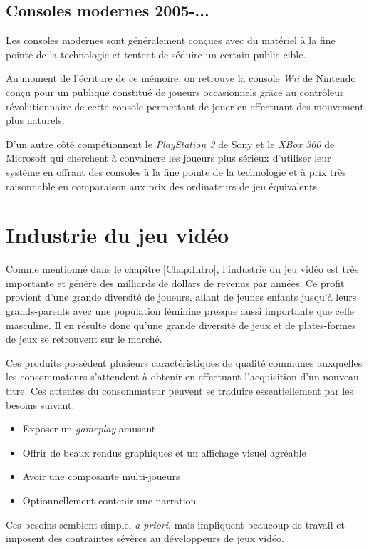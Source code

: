 \documentclass[12pt,oneside,letterpaper,francais]{book}
\begin{document}
\subsection{Consoles modernes 2005-...}
Les consoles modernes sont généralement conçues avec du matériel à la
fine pointe de la technologie et tentent de séduire un certain public
cible.

Au moment de l'écriture de ce mémoire, on retrouve la console
\textit{Wii} de Nintendo conçu pour un publique constitué de joueurs
occasionnels grâce au contrôleur révolutionnaire de cette console
permettant de jouer en effectuant des mouvement plus naturels.

D'un autre côté compétionnent le \textit{PlayStation 3} de Sony et le
\textit{XBox 360} de Microsoft qui cherchent à convaincre les joueurs
plus sérieux d'utiliser leur système en offrant des consoles à la fine
pointe de la technologie et à prix très raisonnable en comparaison aux
prix des ordinateurs de jeu équivalents. 



\section{Industrie du jeu vidéo}
Comme mentionné dans le chapitre \ref{Chap:Intro}, l'industrie du jeu
vidéo est très importante et génère des milliards de dollars de
revenus par années. Ce profit provient d'une grande diversité de
joueurs, allant de jeunes enfants jusqu'à leurs grands-parents avec
une population féminine presque aussi importante que celle
masculine. Il en résulte donc qu'une grande diversité de jeux et de
plates-formes de jeux se retrouvent sur le marché.

Ces produits possèdent plusieurs caractéristiques de qualité communes
auxquelles les consommateurs s'attendent à obtenir en effectuant
l'acquisition d'un nouveau titre. Ces attentes du consommateur peuvent
se traduire essentiellement par les besoins suivant:

\begin{itemize}
\item Exposer un \textit{gameplay} amusant
\item Offrir de beaux rendus graphiques et un affichage visuel
  agréable
\item Avoir une composante multi-joueurs
\item Optionnellement contenir une narration 
\end{itemize}

Ces besoins semblent simple, \textit{a priori}, mais impliquent
beaucoup de travail et imposent des contraintes sévères au
développeurs de jeux vidéo.
\end{document}
